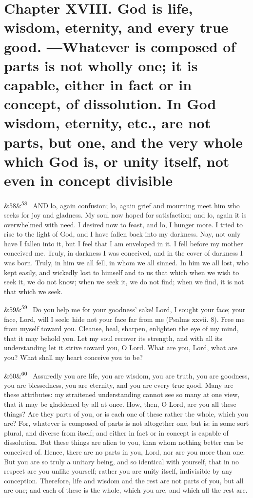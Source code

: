 \documentclass[12pt]{article}
\newcommand{\para}[1][]{\par\noindent\ifx&#1&\else\textsuperscript{\footnotesize #1}~\fi}
\begin{document}
\section*{Chapter XVIII. God is life, wisdom, eternity, and every true good. ---Whatever is composed of parts is not wholly one; it is capable, either in fact or in concept, of dissolution. In God wisdom, eternity, etc., are not parts, but one, and the very whole which God is, or unity itself, not even in concept divisible}

\para[58] AND lo, again confusion; lo, again grief and mourning meet him who seeks for joy and gladness. My soul now hoped for satisfaction; and lo, again it is overwhelmed with need. I desired now to feast, and lo, I hunger more. I tried to rise to the light of God, and I have fallen back into my darkness. Nay, not only have I fallen into it, but I feel that I am enveloped in it. I fell before my mother conceived me. Truly, in darkness I was conceived, and in the cover of darkness I was born. Truly, in him we all fell, in whom we all sinned. In him we all lost, who kept easily, and wickedly lost to himself and to us that which when we wish to seek it, we do not know; when we seek it, we do not find; when we find, it is not that which we seek.

\para[59] Do you help me for your goodness' sake! Lord, I sought your face; your face, Lord, will I seek; hide not your face far from me (Psalms xxvii. 8). Free me from myself toward you. Cleanse, heal, sharpen, enlighten the eye of my mind, that it may behold you. Let my soul recover its strength, and with all its understanding let it strive toward you, O Lord. What are you, Lord, what are you? What shall my heart conceive you to be?

\para[60] Assuredly you are life, you are wisdom, you are truth, you are goodness, you are blessedness, you are eternity, and you are every true good. Many are these attributes: my straitened understanding cannot see so many at one view, that it may be gladdened by all at once. How, then, O Lord, are you all these things? Are they parts of you, or is each one of these rather the whole, which you are? For, whatever is composed of parts is not altogether one, but is: in some sort plural, and diverse from itself; and either in fact or in concept is capable of dissolution. But these things are alien to you, than whom nothing better can be conceived of. Hence, there are no parts in you, Lord, nor are you more than one. But you are so truly a unitary being, and so identical with yourself, that in no respect are you unlike yourself; rather you are unity itself, indivisible by any conception. Therefore, life and wisdom and the rest are not parts of you, but all are one; and each of these is the whole, which you are, and which all the rest are.
\end{document}
